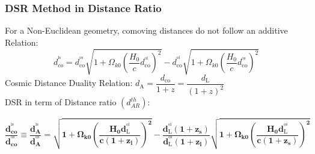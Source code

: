 \documentclass[10pt,xcolor={dvipsnames}]{beamer}
\begin{document}
 \begin{frame}
 \frametitle{DSR Method in Distance Ratio}
 \vspace{3mm}
   For a Non-Euclidean geometry, comoving distances do not follow an additive Relation:
  $$
  d_{c o}^{^{\mathrm{ls}}}= d_\mathrm{c o}^{^\mathrm{os}} \sqrt{1+\Omega_{k0} \left(\dfrac{H_0}{c}d_\mathrm{c o}^\mathrm{^{ol}}\right)^{2}}-d_\mathrm{c o}^{^\mathrm{ol} }\sqrt{1+\Omega_{k0}\left(\dfrac{H_0}{c} d_\mathrm{c o}^{^\mathrm{os}}\right)^{2}}
  $$
    Cosmic Distance Duality Relation:  $d_\mathrm{A}=\dfrac{d_\mathrm{c o}}{1+z}=\dfrac{d_\mathrm{L}}{(1+z)^{2}}$
  \vspace{3mm}\\
 DSR in term of Distance ratio $\left(d_{AR}^{th}\right)$:
 \vspace{1mm}\\
\begin{footnotesize}
$$
{\boxed{\boldsymbol{\dfrac{d_{c o}^{^{\mathrm{ls}}}}{d_{c o}^{^{\mathrm{os}}}}\equiv\dfrac{d_{A}^{^{\mathrm{ls}}}}{d_{A}^{^{\mathrm{os}}}}= \sqrt{1+\Omega_{k0} \left(\dfrac{H_0d_\mathrm{L}^\mathrm{^{ol}}}{c(1+z_l)}\right)^{2}}-\dfrac{d_\mathrm{L}^{^\mathrm{ol} }(1+z_s)}{ d_\mathrm{L}^{^\mathrm{os}}(1+z_l)}\sqrt{1+\Omega_{k0}\left(\dfrac{H_0d_\mathrm{L}^{^\mathrm{os}}}{c(1+z_s)} \right)^{2}}}}}
 $$
\end{footnotesize}
 \end{frame}
\end{document}
